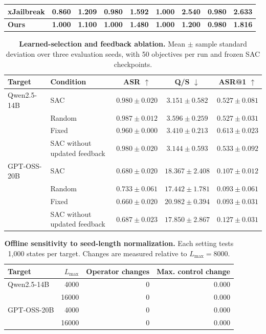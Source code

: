\begin{table}[t]
{\begin{tabular}{
@{}l
cc
cc
cc
cc@{}
}
xJailbreak
& 0.860 & 1.209
& 0.980 & 1.592
& \textbf{1.000} & 2.540
& \textbf{0.980} & 2.633
\\

\midrule

\textbf{Ours}
& \textbf{1.000} & \textbf{1.100}
& \textbf{1.000} & \textbf{1.480}
& \textbf{1.000} & \textbf{1.200}
& \textbf{0.980} & \textbf{1.816}
\\

\bottomrule
\end{tabular}%
}

\end{table}

\begin{table}[t]
\centering
\small
\caption{\textbf{Learned-selection and feedback ablation.}
Mean $\pm$ sample standard deviation over three evaluation seeds,
with 50 objectives per run and frozen SAC checkpoints.}
\label{tab:controller_feedback_ablation}
\begin{tabular}{llccc}
\toprule
\textbf{Target} & \textbf{Condition}
& \textbf{ASR} $\uparrow$ & \textbf{Q/S} $\downarrow$
& \textbf{ASR@1} $\uparrow$ \\
\midrule
Qwen2.5-14B & SAC & $0.980 \pm 0.020$ & $3.151 \pm 0.582$ & $0.527 \pm 0.081$ \\
 & Random & $0.987 \pm 0.012$ & $3.596 \pm 0.259$ & $0.527 \pm 0.031$ \\
 & Fixed & $0.960 \pm 0.000$ & $3.410 \pm 0.213$ & $0.613 \pm 0.023$ \\
 & SAC without updated feedback & $0.980 \pm 0.020$ & $3.144 \pm 0.593$ & $0.533 \pm 0.092$ \\
\midrule
GPT-OSS-20B & SAC & $0.680 \pm 0.020$ & $18.367 \pm 2.408$ & $0.107 \pm 0.012$ \\
 & Random & $0.733 \pm 0.061$ & $17.442 \pm 1.781$ & $0.093 \pm 0.061$ \\
 & Fixed & $0.660 \pm 0.020$ & $20.982 \pm 0.394$ & $0.093 \pm 0.031$ \\
 & SAC without updated feedback & $0.687 \pm 0.023$ & $17.850 \pm 2.867$ & $0.127 \pm 0.031$ \\
\bottomrule
\end{tabular}
\end{table}

\begin{table}[t]
\centering
\small
\caption{\textbf{Offline sensitivity to seed-length normalization.}
Each setting tests 1,000 states per target. Changes are measured
relative to $L_{\max}=8000$.}
\label{tab:lmax_sensitivity}

\begin{tabular}{lrrr}
\toprule
\textbf{Target}
& $L_{\max}$
& \textbf{Operator changes}
& \textbf{Max. control change} \\
\midrule
Qwen2.5-14B & 4000  & 0 & 0.000 \\
            & 16000 & 0 & 0.000 \\
\midrule
GPT-OSS-20B & 4000  & 0 & 0.000 \\
            & 16000 & 0 & 0.000 \\
\bottomrule
\end{tabular}
\end{table}

